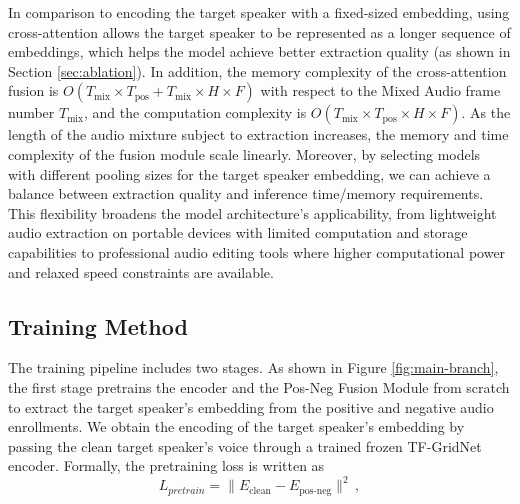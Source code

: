 In comparison to encoding the target speaker with a fixed-sized embedding, using cross-attention allows the target speaker to be represented as a longer sequence of embeddings, which helps the model achieve better extraction quality (as shown in Section \ref{sec:ablation}). In addition, the memory complexity of the cross-attention fusion is $O(T_{\text{mix}}\times T_{\text{pos}} + T_{\text{mix}}\times H \times F)$ with respect to the Mixed Audio frame number $T_{\text{mix}}$, and the computation complexity is $O(T_{\text{mix}}\times T_{\text{pos}} \times H \times F)$. As the length of the audio mixture subject to extraction increases, the memory and time complexity of the fusion module scale linearly. Moreover, by selecting models with different pooling sizes for the target speaker embedding, we can achieve a balance between extraction quality and inference time/memory requirements. This flexibility broadens the model architecture's applicability, from lightweight audio extraction on portable devices with limited computation and storage capabilities to professional audio editing tools where higher computational power and relaxed speed constraints are available.








\subsection{Training Method}

The training pipeline includes two stages. As shown in Figure \ref{fig:main-branch}, the first stage pretrains the encoder and the Pos-Neg Fusion Module from scratch to extract the target speaker's embedding from the positive and negative audio enrollments. We obtain the encoding of the target speaker's embedding by passing the clean target speaker's voice through a trained frozen TF-GridNet encoder. 
Formally, the pretraining loss is written as 
\begin{equation}
L_{pretrain} = \|E_{\text{clean}} - E_{\text{pos-neg}}\|^2 \,,
\end{equation}

